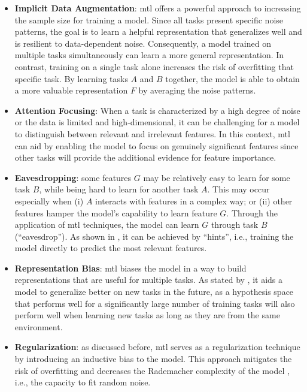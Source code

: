 \begin{itemize}
\item \textbf{Implicit Data Augmentation}: \acl{mtl} offers a powerful approach to increasing the sample size for training a model. Since all tasks present specific noise patterns, the goal is to learn a helpful representation that generalizes well and is resilient to data-dependent noise. Consequently, a model trained on multiple tasks simultaneously can learn a more general representation. In contrast, training on a single task alone increases the risk of overfitting that specific task. By learning tasks $A$ and $B$ together, the model is able to obtain a more valuable representation $F$ by averaging the noise patterns.

\item \textbf{Attention Focusing}: When a task is characterized by a high degree of noise or the data is limited and high-dimensional, it can be challenging for a model to distinguish between relevant and irrelevant features. In this context, \acs{mtl} can aid by enabling the model to focus on genuinely significant features since other tasks will provide the additional evidence for feature importance.

\item \textbf{Eavesdropping}: some features $G$ may be relatively easy to learn for some task $B$, while being hard to learn for another task $A$. This may occur especially when (i) $A$ interacts with features in a complex way; or (ii) other features hamper the model's capability to learn feature $G$. Through the application of \acs{mtl} techniques, the model can learn $G$ through task $B$ (``eavesdrop''). As shown in \citep{abu1990learning}, it can be achieved by ``hints'', i.e., training the model directly to predict the most relevant features.

\item \textbf{Representation Bias}: \acs{mtl} biases the model in a way to build representations that are useful for multiple tasks. As stated by \cite{baxter2000model}, it aids a model to generalize better on new tasks in the future, as a hypothesis space that performs well for a significantly large number of training tasks will also perform well when learning new tasks as long as they are from the same environment.

\item \textbf{Regularization}: as discussed before, \acl{mtl} serves as a regularization technique by introducing an inductive bias to the model. This approach mitigates the risk of overfitting and decreases the Rademacher complexity of the model \citep{shalevshwartz2014understanding}, i.e., the capacity to fit random noise.
\end{itemize}

